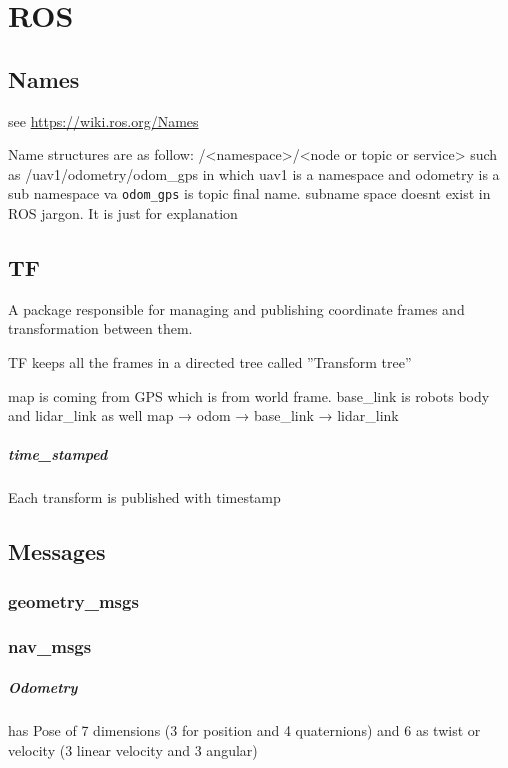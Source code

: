 \chapter{ROS}
    
    
\section{Names}
    see \url{https://wiki.ros.org/Names}
    
    Name structures are as follow:
    /<namespace>/<node or topic or service>
    such as /uav1/odometry/odom\_gps in which uav1 is a namespace and odometry is a sub namespace va \texttt{odom\_gps} is topic final name.
    subname space doesnt exist in ROS jargon. It is just for explanation

\section{TF}
    A package responsible for managing and publishing coordinate frames and transformation between them.
    
    TF keeps all the frames in a directed tree called ''Transform tree''
    
    
    map is coming from GPS which is from world frame. base\_link is robots body and lidar\_link as well
    map → odom → base\_link → lidar\_link
    
    \paragraph{time\_stamped}
        Each transform is published with timestamp
        
    
\section{Messages}
    \subsection{geometry\_msgs}
    \subsection{nav\_msgs}
        \paragraph{Odometry}
            has Pose of 7 dimensions (3 for position and 4 quaternions) and 6 as twist or velocity (3 linear velocity and 3 angular)
